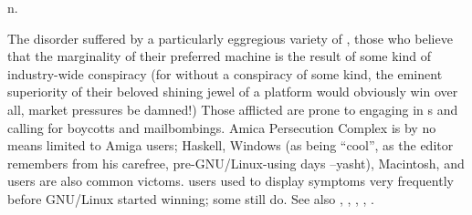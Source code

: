  n.

The disorder suffered by a particularly eggregious variety of , those who believe that the marginality of their preferred
machine is the result of some kind of industry-wide conspiracy (for without a conspiracy of some kind, the eminent superiority of their
beloved shining jewel of a platform would obviously win over all, market pressures be damned!) Those afflicted are prone to engaging in
s and calling for boycotts and mailbombings. Amica Persecution Complex is by no means limited to Amiga users; Haskell,
Windows (as being ``cool'', as the editor remembers from his carefree, pre-GNU/Linux-using days --yasht), Macintosh,  and
 users are also common victoms.  users used to display symptoms very frequently before GNU/Linux started
winning; some still do. See also , , , , .

